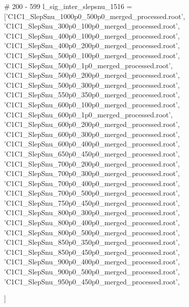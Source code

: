 # 200 - 599
l_sig_inter_slepsnu_1516 = ['C1C1_SlepSnu_1000p0_500p0_merged_processed.root',
'C1C1_SlepSnu_300p0_100p0_merged_processed.root',
'C1C1_SlepSnu_400p0_100p0_merged_processed.root',
'C1C1_SlepSnu_400p0_200p0_merged_processed.root',
'C1C1_SlepSnu_500p0_100p0_merged_processed.root',
'C1C1_SlepSnu_500p0_1p0_merged_processed.root',
'C1C1_SlepSnu_500p0_200p0_merged_processed.root',
'C1C1_SlepSnu_500p0_300p0_merged_processed.root',
'C1C1_SlepSnu_550p0_350p0_merged_processed.root',
'C1C1_SlepSnu_600p0_100p0_merged_processed.root',
'C1C1_SlepSnu_600p0_1p0_merged_processed.root',
'C1C1_SlepSnu_600p0_200p0_merged_processed.root',
'C1C1_SlepSnu_600p0_300p0_merged_processed.root',
'C1C1_SlepSnu_600p0_400p0_merged_processed.root',
'C1C1_SlepSnu_650p0_450p0_merged_processed.root',
'C1C1_SlepSnu_700p0_200p0_merged_processed.root',
'C1C1_SlepSnu_700p0_300p0_merged_processed.root',
'C1C1_SlepSnu_700p0_400p0_merged_processed.root',
'C1C1_SlepSnu_700p0_500p0_merged_processed.root',
'C1C1_SlepSnu_750p0_450p0_merged_processed.root',
'C1C1_SlepSnu_800p0_300p0_merged_processed.root',
'C1C1_SlepSnu_800p0_400p0_merged_processed.root',
'C1C1_SlepSnu_800p0_500p0_merged_processed.root',
'C1C1_SlepSnu_850p0_350p0_merged_processed.root',
'C1C1_SlepSnu_850p0_450p0_merged_processed.root',
'C1C1_SlepSnu_900p0_400p0_merged_processed.root',
'C1C1_SlepSnu_900p0_500p0_merged_processed.root',
'C1C1_SlepSnu_950p0_450p0_merged_processed.root',

]


